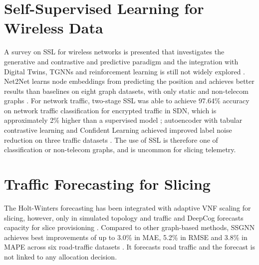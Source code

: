\section{Self-Supervised Learning for Wireless Data}
A survey on SSL for wireless networks is presented that investigates the generative and contrastive and predictive paradigm and the integration with Digital Twins, TGNNs and reinforcement learning is still not widely explored \cite{sslwireless2024}. Net2Net learns node embeddings from predicting the position and achieves better results than baselines on eight graph datasets, with only static and non-telecom graphs \cite{net2net2025}. For network traffic, two-stage SSL was able to achieve 97.64\% accuracy on network traffic classification for encrypted traffic in SDN, which is approximately 2\% higher than a supervised model \cite{sslsdn2022}; autoencoder with tabular contrastive learning and Confident Learning achieved improved label noise reduction on three traffic datasets \cite{sslcl2025}. The use of SSL is therefore one of classification or non-telecom graphs, and is uncommon for slicing telemetry.

\section{Traffic Forecasting for Slicing}
The Holt-Winters forecasting has been integrated with adaptive VNF scaling for slicing, however, only in simulated topology and traffic \cite{holtwinters2020} and DeepCog forecasts capacity for slice provisioning \cite{bega2020deepcog}. Compared to other graph-based methods, SSGNN achieves best improvements of up to 3.0\% in MAE, 5.2\% in RMSE and 3.8\% in MAPE across six road-traffic datasets \cite{ssgnn2023}. It forecasts road traffic and the forecast is not linked to any allocation decision.

